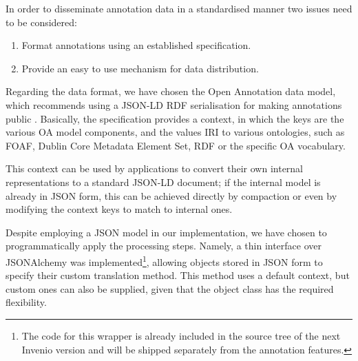 
In order to disseminate annotation data in a standardised manner two issues
need to be considered:
\begin{enumerate}
  \item Format annotations using an established specification.
  \item Provide an easy to use mechanism for data distribution.
\end{enumerate}

Regarding the data format, we have chosen the Open Annotation data model, which
recommends using a JSON-LD RDF serialisation for making annotations public
\cite{ref:oa}. Basically, the specification provides a context, in which the
keys are the various OA model components, and the values IRI to various
ontologies, such as FOAF, Dublin Core Metadata Element Set, RDF or the specific
OA vocabulary.

This context can be used by applications to convert their own internal
representations to a standard JSON-LD document; if the internal model is
already in JSON form, this can be achieved directly by compaction or even by
modifying the context keys to match to internal ones.

Despite employing a JSON model in our implementation, we have chosen to
programmatically apply the processing steps. Namely, a thin interface over
JSONAlchemy was implemented\footnote{The code for this wrapper is already
included in the source tree of the next Invenio version and will be shipped
separately from the annotation features.}, allowing objects stored in JSON form
to specify their custom translation method. This method uses a default context,
but custom ones can also be supplied, given that the object class has the
required flexibility.

